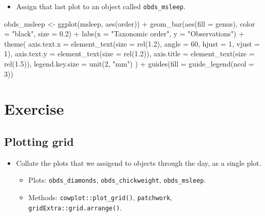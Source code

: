 \documentclass[
  letterpaper,
  DIV=11,
  numbers=noendperiod]{scrartcl}
\newenvironment{Shaded}{\begin{snugshade}}{\end{snugshade}}
\newcommand{\AttributeTok}[1]{\textcolor[rgb]{0.40,0.45,0.13}{#1}}
\newcommand{\DecValTok}[1]{\textcolor[rgb]{0.68,0.00,0.00}{#1}}
\newcommand{\FloatTok}[1]{\textcolor[rgb]{0.68,0.00,0.00}{#1}}
\newcommand{\FunctionTok}[1]{\textcolor[rgb]{0.28,0.35,0.67}{#1}}
\newcommand{\NormalTok}[1]{\textcolor[rgb]{0.00,0.23,0.31}{#1}}
\newcommand{\OtherTok}[1]{\textcolor[rgb]{0.00,0.23,0.31}{#1}}
\newcommand{\SpecialCharTok}[1]{\textcolor[rgb]{0.37,0.37,0.37}{#1}}
\newcommand{\StringTok}[1]{\textcolor[rgb]{0.13,0.47,0.30}{#1}}
\providecommand{\tightlist}{%
  \setlength{\itemsep}{0pt}\setlength{\parskip}{0pt}}\usepackage{longtable,booktabs,array}
\begin{document}
\begin{itemize}
\tightlist
\item
  Assign that last plot to an object called \texttt{obds\_msleep}.
\end{itemize}

\begin{Shaded}
\begin{Highlighting}[]
\NormalTok{obds\_msleep }\OtherTok{\textless{}{-}} \FunctionTok{ggplot}\NormalTok{(msleep, }\FunctionTok{aes}\NormalTok{(order)) }\SpecialCharTok{+}
  \FunctionTok{geom\_bar}\NormalTok{(}\FunctionTok{aes}\NormalTok{(}\AttributeTok{fill =}\NormalTok{ genus), }\AttributeTok{color =} \StringTok{"black"}\NormalTok{, }\AttributeTok{size =} \FloatTok{0.2}\NormalTok{) }\SpecialCharTok{+}
  \FunctionTok{labs}\NormalTok{(}\AttributeTok{x =} \StringTok{"Taxonomic order"}\NormalTok{, }\AttributeTok{y =} \StringTok{"Observations"}\NormalTok{) }\SpecialCharTok{+}
  \FunctionTok{theme}\NormalTok{(}
    \AttributeTok{axis.text.x =} \FunctionTok{element\_text}\NormalTok{(}\AttributeTok{size =} \FunctionTok{rel}\NormalTok{(}\FloatTok{1.2}\NormalTok{), }\AttributeTok{angle =} \DecValTok{60}\NormalTok{, }\AttributeTok{hjust =} \DecValTok{1}\NormalTok{, }\AttributeTok{vjust =} \DecValTok{1}\NormalTok{),}
    \AttributeTok{axis.text.y =} \FunctionTok{element\_text}\NormalTok{(}\AttributeTok{size =} \FunctionTok{rel}\NormalTok{(}\FloatTok{1.2}\NormalTok{)),}
    \AttributeTok{axis.title =} \FunctionTok{element\_text}\NormalTok{(}\AttributeTok{size =} \FunctionTok{rel}\NormalTok{(}\FloatTok{1.5}\NormalTok{)),}
    \AttributeTok{legend.key.size =} \FunctionTok{unit}\NormalTok{(}\DecValTok{2}\NormalTok{, }\StringTok{"mm"}\NormalTok{)}
\NormalTok{    ) }\SpecialCharTok{+}
  \FunctionTok{guides}\NormalTok{(}\AttributeTok{fill =} \FunctionTok{guide\_legend}\NormalTok{(}\AttributeTok{ncol =} \DecValTok{3}\NormalTok{))}
\end{Highlighting}
\end{Shaded}

\section{Exercise}\label{exercise-4}

\subsection{Plotting grid}\label{plotting-grid}

\begin{itemize}
\item
  Collate the plots that we assigend to objects through the day, as a
  single plot.

  \begin{itemize}
  \item
    Plots: \texttt{obds\_diamonds}, \texttt{obds\_chickweight},
    \texttt{obds\_msleep}.
  \item
    Methods: \texttt{cowplot::plot\_grid()}, \texttt{patchwork},
    \texttt{gridExtra::grid.arrange()}.
  \end{itemize}
\end{itemize}
\end{document}
